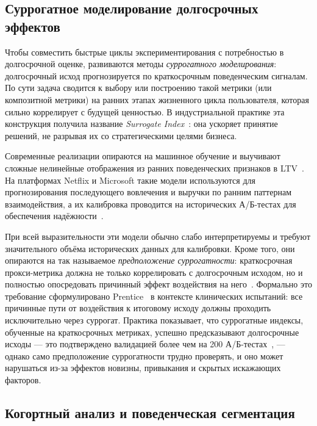 \subsection*{Суррогатное моделирование долгосрочных эффектов}

Чтобы совместить быстрые циклы экспериментирования с потребностью в
долгосрочной оценке, развиваются методы \textit{суррогатного моделирования}:
долгосрочный исход прогнозируется по краткосрочным поведенческим сигналам.
По сути задача сводится к выбору или построению такой метрики (или
композитной метрики) на ранних этапах жизненного цикла пользователя, которая
сильно коррелирует с будущей ценностью. В индустриальной практике эта
конструкция получила название \textit{Surrogate
Index}~\cite{dimakopoulou2023evaluating}: она ускоряет принятие решений,
не разрывая их со стратегическими целями бизнеса.

Современные реализации опираются на машинное обучение и выучивают сложные
нелинейные отображения из ранних поведенческих признаков
в LTV~\cite{harper2024long}. На платформах Netflix и Microsoft такие модели
используются для прогнозирования последующего вовлечения и выручки по
ранним паттернам взаимодействия, а их калибровка проводится на исторических
А/Б-тестах для обеспечения
надёжности~\cite{dimakopoulou2023evaluating,sadeghi2021novelty}.

При всей выразительности эти модели обычно слабо интерпретируемы и требуют
значительного объёма исторических данных для калибровки. Кроме того, они
опираются на так называемое \textit{предположение суррогатности}:
краткосрочная прокси-метрика должна не только коррелировать с долгосрочным
исходом, но и полностью опосредовать причинный эффект воздействия на
него~\cite{dimakopoulou2023evaluating}. Формально это требование
сформулировано Prentice~\cite{prentice1989} в контексте клинических
испытаний: все причинные пути от воздействия к итоговому исходу должны
проходить исключительно через суррогат. Практика показывает, что
суррогатные индексы, обученные на краткосрочных метриках, успешно
предсказывают долгосрочные исходы --- это подтверждено валидацией более
чем на 200 А/Б-тестах~\cite{dimakopoulou2023evaluating}, --- однако само
предположение суррогатности трудно проверять, и оно может нарушаться из-за
эффектов новизны, привыкания и скрытых искажающих факторов.

\subsection*{Когортный анализ и поведенческая сегментация}

